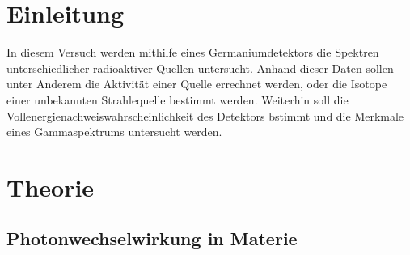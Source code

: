 \section{Einleitung}
In diesem Versuch werden mithilfe eines Germaniumdetektors die Spektren
unterschiedlicher radioaktiver Quellen untersucht. Anhand dieser Daten sollen unter Anderem
die Aktivität einer Quelle errechnet werden, oder die Isotope einer unbekannten Strahlequelle bestimmt
werden. Weiterhin soll die Vollenergienachweiswahrscheinlichkeit des Detektors bstimmt und die Merkmale eines Gammaspektrums untersucht werden.

\section{Theorie}


\subsection{Photonwechselwirkung in Materie}

